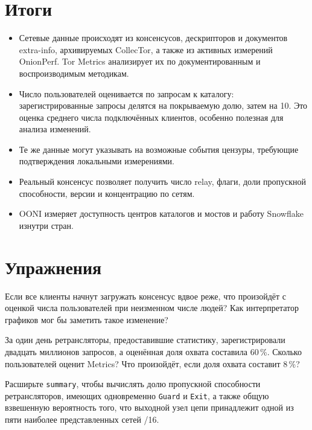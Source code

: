 \section*{Итоги}
\begin{itemize}
  \item Сетевые данные происходят из консенсусов, дескрипторов и документов extra-info, архивируемых CollecTor, а также из активных измерений OnionPerf. Tor Metrics анализирует их по документированным и воспроизводимым методикам.
  \item Число пользователей оценивается по запросам к каталогу: зарегистрированные запросы делятся на покрываемую долю, затем на 10. Это оценка среднего числа подключённых клиентов, особенно полезная для анализа изменений.
  \item Те же данные могут указывать на возможные события цензуры, требующие подтверждения локальными измерениями.
  \item Реальный консенсус позволяет получить число relay, флаги, доли пропускной способности, версии и концентрацию по сетям.
  \item OONI измеряет доступность центров каталогов и мостов и работу Snowflake изнутри стран.
\end{itemize}

\section*{Упражнения}

\begin{esercizio}[1]\label{es:24-dieci}
Если все клиенты начнут загружать консенсус вдвое реже, что произойдёт с оценкой числа пользователей при неизменном числе людей? Как интерпретатор графиков мог бы заметить такое изменение?
\end{esercizio}

\begin{esercizio}[1]\label{es:24-frazione}
За один день ретрансляторы, предоставившие статистику, зарегистрировали двадцать миллионов запросов, а оценённая доля охвата составила 60\,\%. Сколько пользователей оценит Metrics? Что произойдёт, если доля охвата составит 8\,\%?
\end{esercizio}

\begin{esercizio}[2]\label{es:24-flag}
Расширьте \texttt{summary}, чтобы вычислять долю пропускной способности ретрансляторов, имеющих одновременно \texttt{Guard} и \texttt{Exit}, а также общую взвешенную вероятность того, что выходной узел цепи принадлежит одной из пяти наиболее представленных сетей /16.
\end{esercizio}

